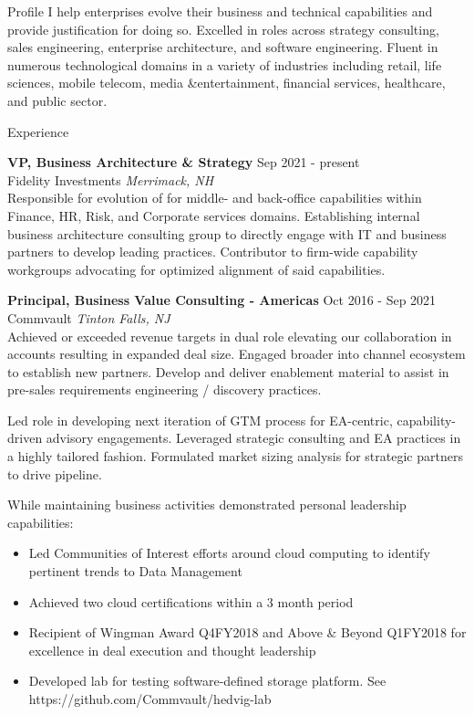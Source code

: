 \documentclass{resume} %
\begin{document}
\begin{rSection}{Profile}
I help enterprises evolve their business and technical capabilities and provide justification for doing so. Excelled in roles across strategy consulting, sales engineering, enterprise architecture, and software engineering. Fluent in numerous technological domains in a variety of industries including retail, life sciences, mobile telecom, media \&entertainment, financial services, healthcare, and public sector.

\end{rSection}

\begin{rSection}{Experience}

\textbf{VP, Business Architecture \& Strategy} \hfill Sep 2021 - present\\
Fidelity Investments \hfill \textit{Merrimack, NH}\\
Responsible for evolution of for middle- and back-office capabilities within Finance, HR, Risk, and Corporate services domains. Establishing internal business architecture consulting group to directly engage with IT and business partners to develop leading practices. Contributor to firm-wide capability workgroups advocating for optimized alignment of said capabilities.
 
\textbf{Principal, Business Value Consulting - Americas} \hfill Oct 2016 - Sep 2021\\
Commvault \hfill \textit{Tinton Falls, NJ}\\
Achieved or exceeded revenue targets in dual role elevating our collaboration in accounts resulting in expanded deal size.  Engaged broader into channel ecosystem to establish new partners. Develop and deliver enablement material to assist in pre-sales requirements engineering / discovery practices.

Led role in developing next iteration of GTM process for EA-centric, capability-driven advisory engagements. Leveraged strategic consulting and EA practices in a highly tailored fashion. Formulated market sizing analysis for strategic partners to drive pipeline.

While maintaining business activities demonstrated personal leadership capabilities:
\begin{itemize}
   \itemsep -3pt {} 
   \item Led Communities of Interest efforts around cloud computing to identify pertinent trends to Data Management
   \item Achieved two cloud certifications within a 3 month period
   \item Recipient of Wingman Award Q4FY2018 and Above \& Beyond Q1FY2018 for excellence in deal execution and thought leadership
   \item Developed lab for testing software-defined storage platform. See https://github.com/Commvault/hedvig-lab
\end{itemize}


\end{rSection}
\end{document}
